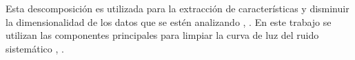 Esta descomposición es utilizada para la extracción de características y disminuir la dimensionalidad de los datos que se estén analizando \cite{mcgurk2010principal}, \cite{medeiros2018principal}. En este trabajo se utilizan las componentes principales para limpiar la curva de luz del ruido sistemático \cite{shin1999iterative}, \cite{bailey2012principal}.